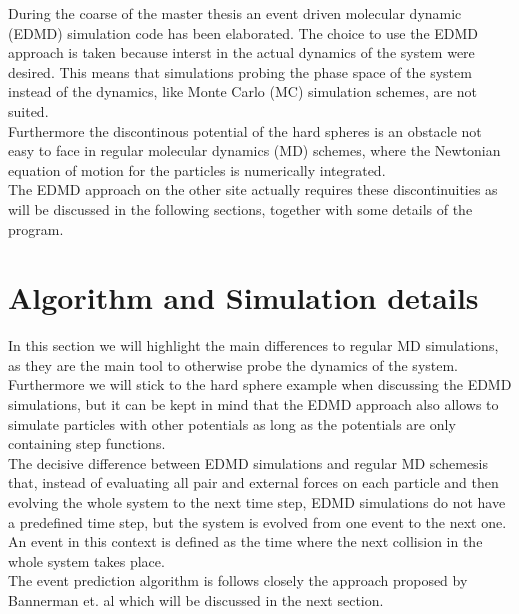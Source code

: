 
\label{chp:simulation}
During the coarse of the master thesis an event driven molecular dynamic (EDMD) simulation code has been elaborated. The choice to use the EDMD approach is taken because interst in the actual dynamics of the system were desired. This means that simulations probing the phase space of the system instead of the dynamics, like Monte Carlo (MC) simulation schemes, are not suited.\\ 
Furthermore the discontinous potential of the hard spheres is an obstacle not easy to face in regular molecular dynamics (MD) schemes, where the Newtonian equation of motion for the particles is numerically integrated.\\
The EDMD approach on the other site actually requires these discontinuities as will be discussed in the following sections, together with some details of the program.\\

\section{Algorithm and Simulation details}
\label{sec:simulation}
In this section we will highlight the main differences to regular MD simulations, as they are the main tool to otherwise probe the dynamics of the system. Furthermore we will stick to the hard sphere example when discussing the EDMD simulations, but it can be kept in mind that the EDMD approach also allows to simulate particles with other potentials as long as the potentials are only containing step functions.\\
 
The decisive difference between EDMD simulations and regular MD schemesis that, instead of evaluating all pair and external forces on each particle and then evolving the whole system to the next time step, EDMD simulations do not have a predefined time step, but the system is evolved from one event to the next one. An event in this context is defined as the time where the next collision in the whole system takes place.\\

The event prediction algorithm is follows closely the approach proposed by Bannerman et. al \cite{Bannerman2014} which will be discussed in the next section.\\

